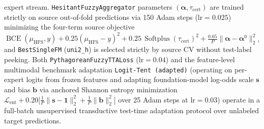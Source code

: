 \documentclass[10pt,twocolumn]{article}
\begin{document}
\begin{enumerate}[leftmargin=1.4em,itemsep=1pt,topsep=2pt]
    expert stream.
    \texttt{HesitantFuzzyAggregator} parameters $(\bm{\alpha},\tau_{\text{cert}})$ are trained
    strictly on source out-of-fold predictions via 150 Adam steps ($\text{lr}=0.025$)
    minimizing
    the four-term source objective $\operatorname{BCE}(\mu_{\text{HFS}}, y) +
    0.25(\mu_{\text{HFS}}
    - y)^2 + 0.25\,\operatorname{Softplus}(\tau_{\text{cert}})^2 + \frac{0.05}{P}\|\bm{\alpha}
    -
    \bm{\alpha}^0\|_2^2$, and
    \texttt{BestSingleFM} (\texttt{uni2\_h}) is selected strictly by source CV without
    test-label peeking. Both \texttt{PythagoreanFuzzyTTALoss} ($\text{lr}=0.04$) and
    the feature-level multimodal benchmark adaptation \texttt{Logit-Tent (adapted)}
    \cite{wang2021tent} (operating on per-expert logits from frozen features and adapting
    foundation-model log-odds scale $\bm{s}$ and bias $\bm{b}$ via anchored Shannon entropy
    minimization $\mathcal{L}_{\text{ent}} + 0.20\big[\frac{1}{P}\|\bm{s}-\mathbf{1}\|_2^2 +
    \frac{1}{P}\|\bm{b}\|_2^2\big]$ over 25 Adam steps at $\text{lr}=0.03$) operate in a
    full-batch unsupervised transductive test-time adaptation protocol over unlabeled target
    predictions.
\end{enumerate}
\end{document}
